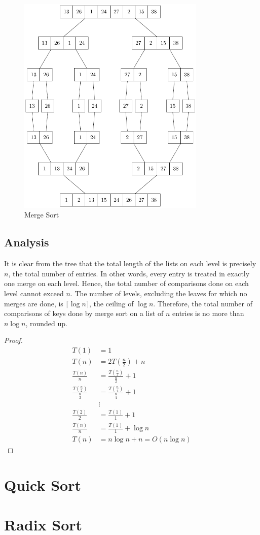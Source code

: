 \begin{minipage}{0.6\textwidth}
  \begin{figure}[H]
    \centering
    \includegraphics[width=0.8\textwidth]{Figure/MergeSort.pdf}
    \caption*{Merge Sort}
  \end{figure}
\end{minipage}

\subsection{Analysis}
It is clear from the tree that the total length of the lists on each level is precisely \(n\), the total number of entries. In other words, every entry is treated in exactly one merge on each level. Hence, the total number of comparisons done on each level cannot exceed \(n\). The number of levels, excluding the leaves for which no merges are done, is \(\lceil \log n \rceil\), the ceiling of \(\log n\). Therefore, the total number of comparisons of keys done by merge sort on a list of \(n\) entries is no more than \(n \log n\), rounded up.

\begin{proof}
\[
\begin{aligned}
  T(1) &= 1 \\
  T(n) &= 2T(\frac{n}{2}) + n \\
  \frac{T(n)}{n} &= \frac{T(\frac{n}{2})}{\frac{n}{2}} + 1 \\
  \frac{T(\frac{n}{2})}{\frac{n}{2}} &= \frac{T(\frac{n}{4})}{\frac{n}{4}} + 1 \\
  &\vdots \\
  \frac{T(2)}{2} &= \frac{T(1)}{1} + 1 \\
  \frac{T(n)}{n} &= \frac{T(1)}{1} + \log n \\
  T(n) &= n\log n + n = O(n\log n)
\end{aligned}
\]
\end{proof}

\section{Quick Sort}


\section{Radix Sort}
